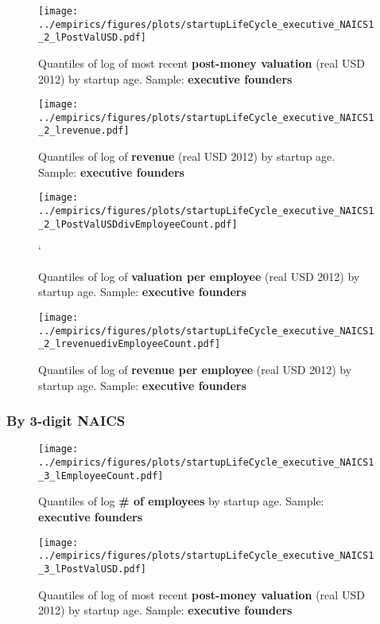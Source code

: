 \documentclass[12pt,english]{article}
\theoremstyle{remark}
\let\Oldsubsubsection\subsubsection
\renewcommand{\subsubsection}{\FloatBarrier\Oldsubsubsection}
\begin{document}
\begin{figure}[!htb]
	\centering
	\texttt{[image: ../empirics/figures/plots/startupLifeCycle\_executive\_NAICS1\_2\_lPostValUSD.pdf]}
	\caption{Quantiles of log of most recent \textbf{post-money valuation} (real USD 2012) by startup age. 
		Sample: \textbf{executive founders}}
\end{figure}

\begin{figure}[!htb]
	\centering
	\texttt{[image: ../empirics/figures/plots/startupLifeCycle\_executive\_NAICS1\_2\_lrevenue.pdf]}
	\caption{Quantiles of log of \textbf{revenue} (real USD 2012) by startup age. 
		Sample: \textbf{executive founders}}
\end{figure}

\begin{figure}[!htb]
	\centering
	\texttt{[image: ../empirics/figures/plots/startupLifeCycle\_executive\_NAICS1\_2\_lPostValUSDdivEmployeeCount.pdf]}
	\caption{Quantiles of log of \textbf{valuation per employee} (real USD 2012) by startup age. 
		Sample: \textbf{executive founders}}`
\end{figure}

\begin{figure}[!htb]
	\centering
	\texttt{[image: ../empirics/figures/plots/startupLifeCycle\_executive\_NAICS1\_2\_lrevenuedivEmployeeCount.pdf]}
	\caption{Quantiles of log of \textbf{revenue per employee} (real USD 2012) by startup age. 
		Sample: \textbf{executive founders}}
\end{figure}

\subsubsection{By 3-digit NAICS}

\begin{figure}[!htb]
	\centering
	\texttt{[image: ../empirics/figures/plots/startupLifeCycle\_executive\_NAICS1\_3\_lEmployeeCount.pdf]}
	\caption{Quantiles of log \textbf{\# of employees} by startup age. 
		Sample: \textbf{executive founders}}
\end{figure}

\begin{figure}[!htb]
	\centering
	\texttt{[image: ../empirics/figures/plots/startupLifeCycle\_executive\_NAICS1\_3\_lPostValUSD.pdf]}
	\caption{Quantiles of log of most recent \textbf{post-money valuation} (real USD 2012) by startup age. 
		Sample: \textbf{executive founders}}
\end{figure}
\end{document}
